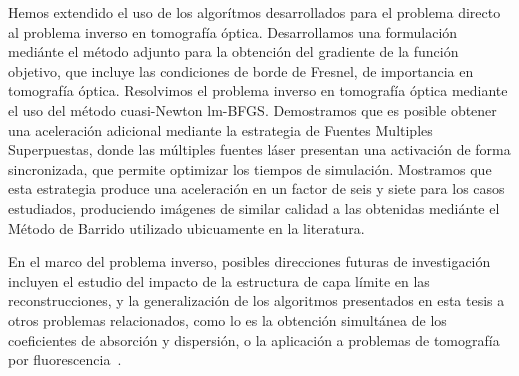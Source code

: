  Hemos extendido el uso de los algorítmos desarrollados 
 para el problema directo al problema inverso en tomografía óptica. 
 Desarrollamos una formulación mediánte el método adjunto para 
 la obtención del gradiente de la función objetivo, que incluye 
 las condiciones de borde de Fresnel, de importancia en tomografía óptica. 
 Resolvimos el problema inverso en tomografía óptica mediante el uso 
 del método cuasi-Newton lm-BFGS.
 Demostramos que es posible obtener una aceleración adicional 
 mediante la estrategia de Fuentes Multiples Superpuestas, 
 donde las múltiples fuentes láser presentan una activación de 
 forma sincronizada, que permite optimizar los tiempos de simulación. 
 Mostramos que esta estrategia produce una aceleración en un factor de 
 seis y siete para los casos estudiados, produciendo imágenes 
 de similar calidad a las obtenidas mediánte el Método de Barrido 
 utilizado ubicuamente en la literatura. 

 En el marco del problema inverso, posibles direcciones futuras 
 de investigación incluyen el estudio del impacto 
 de la estructura de capa límite en las reconstrucciones, 
 y la generalización de los algoritmos presentados en esta tesis 
 a otros problemas relacionados, como lo es la obtención 
 simultánea de los coeficientes de absorción y dispersión, 
 o la aplicación a problemas de tomografía por fluorescencia~\cite{Klose2009,Ren2010}.


\pagestyle{empty}
